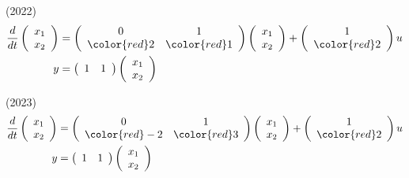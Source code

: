 (2022)
\begin{align*}
	\frac{d}{dt}
	\left (
	\begin{array}{c}
	 x_1 \\ x_2 
	\end{array}
	\right )
	& = 
	\left (
	\begin{array}{cc}
	 0 & 1 \\
	 \color{red} 2 & \color{red} 1
	\end{array}
	\right )
	\left (
	\begin{array}{c}
	 x_1 \\ x_2 
	\end{array}
	\right )
	+
	\left (
	\begin{array}{c}
	 1 \\ \color{red} 2
	\end{array}
	\right )
	u
\\
	y 
	&=
	\left (
	\begin{array}{cc}
	 1 & 1  
	\end{array}
	\right )
	\left (
	\begin{array}{c}
	 x_1 \\ x_2 
	\end{array}
	\right )
\end{align*}

(2023)
\begin{align*}
	\frac{d}{dt}
	\left (
	\begin{array}{c}
	 x_1 \\ x_2 
	\end{array}
	\right )
	& = 
	\left (
	\begin{array}{cc}
	 0 & 1 \\
	 \color{red} -2 & \color{red} 3
	\end{array}
	\right )
	\left (
	\begin{array}{c}
	 x_1 \\ x_2 
	\end{array}
	\right )
	+
	\left (
	\begin{array}{c}
	 1 \\ \color{red} 2
	\end{array}
	\right )
	u
\\
	y 
	&=
	\left (
	\begin{array}{cc}
	 1 & 1  
	\end{array}
	\right )
	\left (
	\begin{array}{c}
	 x_1 \\ x_2 
	\end{array}
	\right )
\end{align*}

